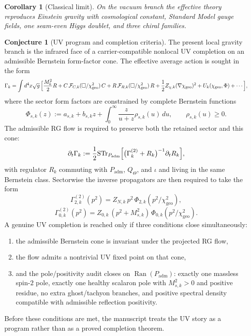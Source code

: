 \documentclass[11pt,a4paper]{article}
\newtheorem{corollary}[theorem]{Corollary}
\theoremstyle{definition}
\newtheorem{conjecture}[theorem]{Conjecture}
\theoremstyle{remark}
\newcommand{\inv}{\iota}
\newcommand{\chigeo}{\chi_{\mathrm{geo}}}
\newcommand{\Padm}{P_{\mathrm{adm}}}
\begin{document}
\begin{corollary}[Classical limit]
On the vacuum branch the effective theory reproduces Einstein gravity with cosmological constant, Standard Model gauge fields, one seam-even Higgs doublet, and three chiral families.
\end{corollary}

\begin{conjecture}[UV program and completion criteria]
The present local gravity branch is the infrared face of a carrier-compatible
nonlocal UV completion on an admissible Bernstein form-factor cone. The effective
average action is sought in the form
\[
\Gamma_k
=
\int d^4x\sqrt g\,
\Bigl[
\frac{M_k^2}{2}R
+C\,\mathcal F_{C,k}(\Box/\chigeo^2)\,C
+R\,\mathcal F_{R,k}(\Box/\chigeo^2)\,R
+\frac12 Z_{\chi,k}(\nabla\chigeo)^2
+U_k(\chigeo,\Phi)
+\cdots
\Bigr],
\]
where the sector form factors are constrained by complete Bernstein functions
\[
\Phi_{s,k}(z)
:=
a_{s,k}+b_{s,k}z+\int_0^\infty \frac{z}{u+z}\rho_{s,k}(u)\,du,
\qquad
\rho_{s,k}(u)\ge 0.
\]
The admissible RG flow is required to preserve both the retained sector and this
cone:
\[
\partial_t\Gamma_k
:=
\frac12\mathrm{STr}_{\Padm}
\Bigl[
\bigl(\Gamma_k^{(2)}+R_k\bigr)^{-1}\partial_t R_k
\Bigr],
\]
with regulator $R_k$ commuting with $\Padm$, $Q_\Theta$, and $\inv$ and living in
the same Bernstein class. Sectorwise the inverse propagators are then required to
take the form
\[
\Gamma^{(2)}_{2,k}(p^2)
=
Z_{N,k}\,p^2\,\Phi_{2,k}(p^2/\chigeo^2),
\]
\[
\Gamma^{(2)}_{0,k}(p^2)
=
Z_{0,k}\,(p^2+M_{s,k}^2)\,\Phi_{0,k}(p^2/\chigeo^2).
\]
A genuine UV completion is reached only if three conditions close
simultaneously:
\begin{enumerate}[label=(\roman*), leftmargin=1.5em, topsep=3pt, itemsep=2pt]
    \item the admissible Bernstein cone is invariant under the projected RG flow,
    \item the flow admits a nontrivial UV fixed point on that cone,
    \item and the pole/positivity audit closes on $\operatorname{Ran}(\Padm)$:
    exactly one massless spin-$2$ pole, exactly one healthy scalaron pole with
    $M_{s,k}^2>0$ and positive residue, no extra ghost/tachyon branches, and
    positive spectral density compatible with admissible reflection positivity.
\end{enumerate}
Before these conditions are met, the manuscript treats the UV story as a
program rather than as a proved completion theorem.
\end{conjecture}
\end{document}

